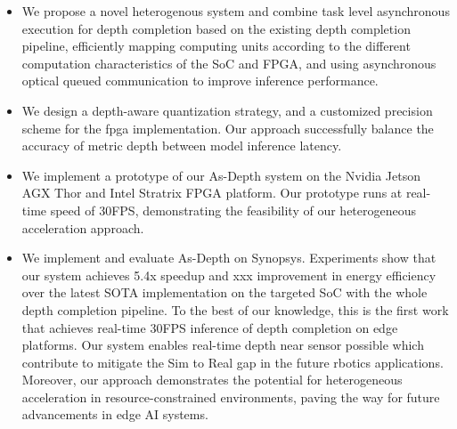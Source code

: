 \begin{itemize}
  \item We propose a novel heterogenous system and combine task level asynchronous execution for depth completion based on the existing depth completion pipeline, efficiently mapping computing units according to the different computation characteristics of the SoC and FPGA, and using asynchronous optical queued communication to improve inference performance. 
  \item We design a depth-aware quantization strategy, and a customized precision scheme for the fpga implementation. Our approach successfully balance the accuracy of metric depth between model inference latency.
  \item We implement a prototype of our As-Depth system on the Nvidia Jetson AGX Thor and Intel Stratrix FPGA platform. Our prototype runs at real-time speed of 30FPS, demonstrating the feasibility of our heterogeneous acceleration approach.
  \item We implement and evaluate As-Depth on Synopsys. Experiments show that our system achieves 5.4x speedup and xxx improvement in energy efficiency over the latest SOTA implementation on the targeted SoC with the whole depth completion pipeline. To the best of our knowledge, this is the first work that achieves real-time 30FPS inference of depth completion on edge platforms.
  Our system enables real-time depth near sensor possible which contribute to mitigate the Sim to Real gap in the future rbotics applications. 
  Moreover, our approach demonstrates the potential for heterogeneous acceleration in resource-constrained environments, paving the way for future advancements in edge AI systems.
\end{itemize}
